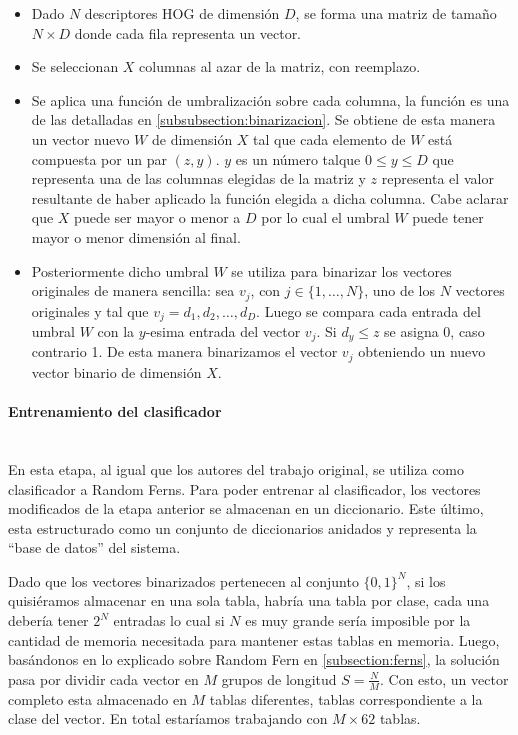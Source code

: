			\begin{itemize}
				\item Dado $N$ descriptores HOG de dimensión $D$, se forma una matriz de tamaño $N \times D$ donde cada fila representa un vector.
				\item Se seleccionan $X$ columnas al azar de la matriz, con reemplazo.
				\item Se aplica una función de umbralización sobre cada columna, la función es una de las detalladas en \ref{subsubsection:binarizacion}. Se obtiene de esta manera un vector nuevo $W$ de dimensión $X$ tal que cada elemento de $W$ está compuesta por un par $(z,y)$. $y$ es un número talque $0 \leq y \leq D$ que representa una de las columnas elegidas de la matriz y $z$ representa el valor resultante de haber aplicado la función elegida a dicha columna. Cabe aclarar que $X$ puede ser mayor o menor a $D$ por lo cual el umbral $W$ puede tener mayor o menor dimensión al final.
				\item Posteriormente dicho umbral $W$ se utiliza para binarizar los vectores originales de manera sencilla: sea $v_j$, con $j \in \{1,\dots,N\}$, uno de los $N$ vectores originales y tal que $v_j = d_1,d_2,\dots,d_D$. Luego se compara cada entrada del umbral $W$ con la $y$-esima entrada del vector $v_j$. Si $d_y \leq z$ se asigna 0, caso contrario 1. De esta manera binarizamos el vector $v_j$ obteniendo un nuevo vector binario de dimensión $X$.
			
			\end{itemize}

		\paragraph{Entrenamiento del clasificador}  ~\\

			En esta etapa, al igual que los autores del trabajo original, se utiliza como clasificador a Random Ferns. Para poder entrenar al clasificador, los vectores modificados de la etapa anterior se almacenan en un diccionario. Este último, esta estructurado como un conjunto de diccionarios anidados y representa la ``base de datos'' del sistema.

			Dado que los vectores binarizados pertenecen al conjunto $\{ 0,1 \}^{N}$, si los quisiéramos almacenar en una sola tabla, habría una tabla por clase, cada una debería tener $2^{N}$ entradas lo cual si $N$ es muy grande sería imposible por la cantidad de memoria necesitada para mantener estas tablas en memoria. Luego, basándonos en lo explicado sobre Random Fern en \ref{subsection:ferns}, la solución pasa por dividir cada vector en $M$ grupos de longitud $S = \frac{N}{M}$. Con esto, un vector completo esta almacenado en $M$ tablas diferentes, tablas correspondiente a la clase del vector. En total estaríamos trabajando con $M \times 62$ tablas.

